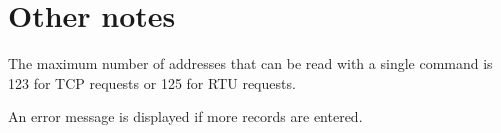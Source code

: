
\chapter{Other notes}

The maximum number of addresses that can be read with a single command is 123 for
TCP requests or 125 for RTU requests.

An error message is displayed if more records are entered.